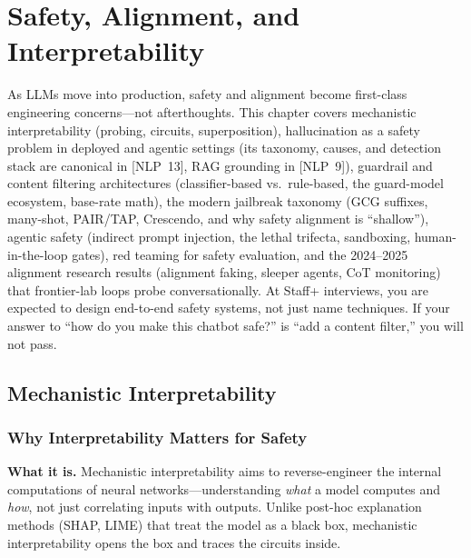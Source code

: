 \chapter{Safety, Alignment, and Interpretability}
\label{chap:safety_alignment}

\begin{tldr}
As LLMs move into production, safety and alignment become first-class engineering concerns---not afterthoughts. This chapter covers mechanistic interpretability (probing, circuits, superposition), hallucination as a safety problem in deployed and agentic settings (its taxonomy, causes, and detection stack are canonical in [NLP~13], RAG grounding in [NLP~9]), guardrail and content filtering architectures (classifier-based vs.\ rule-based, the guard-model ecosystem, base-rate math), the modern jailbreak taxonomy (GCG suffixes, many-shot, PAIR/TAP, Crescendo, and why safety alignment is ``shallow''), agentic safety (indirect prompt injection, the lethal trifecta, sandboxing, human-in-the-loop gates), red teaming for safety evaluation, and the 2024--2025 alignment research results (alignment faking, sleeper agents, CoT monitoring) that frontier-lab loops probe conversationally. At Staff+ interviews, you are expected to design end-to-end safety systems, not just name techniques. If your answer to ``how do you make this chatbot safe?'' is ``add a content filter,'' you will not pass.
\end{tldr}

\section{Mechanistic Interpretability}
\label{sec:mechanistic_interp}

\subsection{Why Interpretability Matters for Safety}

\textbf{What it is.} Mechanistic interpretability aims to reverse-engineer the internal computations of neural networks---understanding \textit{what} a model computes and \textit{how}, not just correlating inputs with outputs. Unlike post-hoc explanation methods (SHAP, LIME) that treat the model as a black box, mechanistic interpretability opens the box and traces the circuits inside.

